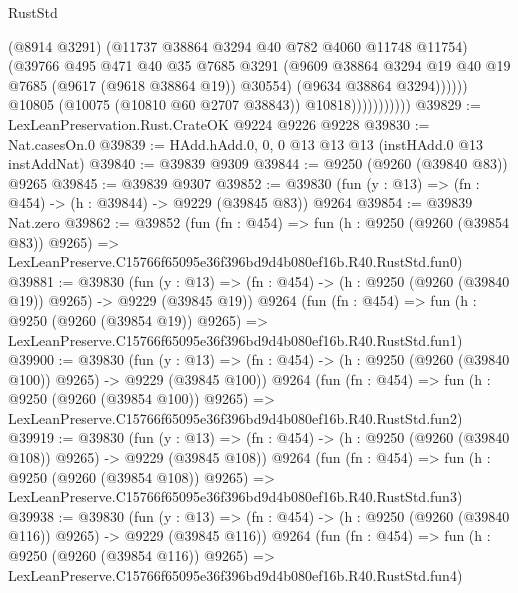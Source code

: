 \begin{lexlean}{RustStd}
\begin{coremodule}
                                  (@8914 @3291)
                                  (@11737 @38864 @3294 @40 @782 @4060 @11748 @11754)
                                  (@39766
                                    @495
                                    @471
                                    @40
                                    @35
                                    @7685
                                    @3291
                                    (@9609
                                      @38864
                                      @3294
                                      @19
                                      @40
                                      @19
                                      @7685
                                      (@9617 (@9618 @38864 @19))
                                      @30554)
                                    (@9634 @38864 @3294))))))
                          @10805
                          (@10075 (@10810 @60 @2707 @38843))
                          @10818)))))))))))
@39829 := LexLeanPreservation.Rust.CrateOK @9224 @9226 @9228
@39830 := Nat.casesOn.{0}
@39839 := HAdd.hAdd.{0, 0, 0} @13 @13 @13 (instHAdd.{0} @13 instAddNat)
@39840 := @39839 @9309
@39844 := @9250 (@9260 (@39840 @83)) @9265
@39845 := @39839 @9307
@39852 := @39830 (fun (y : @13) => (fn : @454) -> (h : @39844) -> @9229 (@39845 @83)) @9264
@39854 := @39839 Nat.zero
@39862 := @39852
    (fun (fn : @454) =>
    fun (h : @9250 (@9260 (@39854 @83)) @9265) =>
    LexLeanPreserve.C15766f65095e36f396bd9d4b080ef16b.R40.RustStd.fun0)
@39881 := @39830
    (fun (y : @13) => (fn : @454) -> (h : @9250 (@9260 (@39840 @19)) @9265) -> @9229 (@39845 @19))
    @9264
    (fun (fn : @454) =>
    fun (h : @9250 (@9260 (@39854 @19)) @9265) =>
    LexLeanPreserve.C15766f65095e36f396bd9d4b080ef16b.R40.RustStd.fun1)
@39900 := @39830
    (fun (y : @13) => (fn : @454) -> (h : @9250 (@9260 (@39840 @100)) @9265) -> @9229 (@39845 @100))
    @9264
    (fun (fn : @454) =>
    fun (h : @9250 (@9260 (@39854 @100)) @9265) =>
    LexLeanPreserve.C15766f65095e36f396bd9d4b080ef16b.R40.RustStd.fun2)
@39919 := @39830
    (fun (y : @13) => (fn : @454) -> (h : @9250 (@9260 (@39840 @108)) @9265) -> @9229 (@39845 @108))
    @9264
    (fun (fn : @454) =>
    fun (h : @9250 (@9260 (@39854 @108)) @9265) =>
    LexLeanPreserve.C15766f65095e36f396bd9d4b080ef16b.R40.RustStd.fun3)
@39938 := @39830
    (fun (y : @13) => (fn : @454) -> (h : @9250 (@9260 (@39840 @116)) @9265) -> @9229 (@39845 @116))
    @9264
    (fun (fn : @454) =>
    fun (h : @9250 (@9260 (@39854 @116)) @9265) =>
    LexLeanPreserve.C15766f65095e36f396bd9d4b080ef16b.R40.RustStd.fun4)

\end{coremodule}
\end{lexlean}
